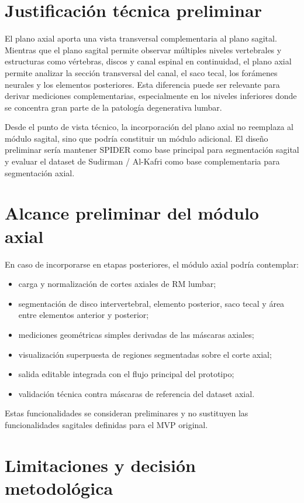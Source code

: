 \section{Justificación técnica preliminar}

El plano axial aporta una vista transversal complementaria al plano sagital. Mientras que el plano sagital permite observar múltiples niveles vertebrales y estructuras como vértebras, discos y canal espinal en continuidad, el plano axial permite analizar la sección transversal del canal, el saco tecal, los forámenes neurales y los elementos posteriores. Esta diferencia puede ser relevante para derivar mediciones complementarias, especialmente en los niveles inferiores donde se concentra gran parte de la patología degenerativa lumbar.

Desde el punto de vista técnico, la incorporación del plano axial no reemplaza al módulo sagital, sino que podría constituir un módulo adicional. El diseño preliminar sería mantener SPIDER como base principal para segmentación sagital y evaluar el dataset de Sudirman / Al-Kafri como base complementaria para segmentación axial.

\section{Alcance preliminar del módulo axial}

En caso de incorporarse en etapas posteriores, el módulo axial podría contemplar:
\begin{itemize}
    \item carga y normalización de cortes axiales de RM lumbar;
    \item segmentación de disco intervertebral, elemento posterior, saco tecal y área entre elementos anterior y posterior;
    \item mediciones geométricas simples derivadas de las máscaras axiales;
    \item visualización superpuesta de regiones segmentadas sobre el corte axial;
    \item salida editable integrada con el flujo principal del prototipo;
    \item validación técnica contra máscaras de referencia del dataset axial.
\end{itemize}

Estas funcionalidades se consideran preliminares y no sustituyen las funcionalidades sagitales definidas para el MVP original.

\section{Limitaciones y decisión metodológica}

